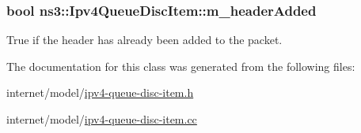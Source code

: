 \subsubsection[{\texorpdfstring{m\+\_\+header\+Added}{m_headerAdded}}]{\setlength{\rightskip}{0pt plus 5cm}bool ns3\+::\+Ipv4\+Queue\+Disc\+Item\+::m\+\_\+header\+Added\hspace{0.3cm}{\ttfamily [private]}}\hypertarget{classns3_1_1Ipv4QueueDiscItem_a04c1067a2893d8b5b6cf2c98d083d0c7}{}\label{classns3_1_1Ipv4QueueDiscItem_a04c1067a2893d8b5b6cf2c98d083d0c7}


True if the header has already been added to the packet. 



The documentation for this class was generated from the following files\+:\begin{DoxyCompactItemize}
\item 
internet/model/\hyperlink{ipv4-queue-disc-item_8h}{ipv4-\/queue-\/disc-\/item.\+h}\item 
internet/model/\hyperlink{ipv4-queue-disc-item_8cc}{ipv4-\/queue-\/disc-\/item.\+cc}\end{DoxyCompactItemize}
